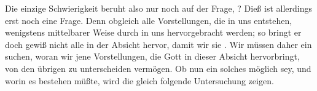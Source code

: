 \begin{aufza}
\item Die einzige Schwierigkeit beruht also nur noch auf der Frage, ? Dieß ist allerdings erst noch eine Frage. Denn obgleich alle Vorstellungen, die in uns entstehen, wenigstens mittelbarer Weise durch  in uns hervorgebracht werden; so bringt er doch gewiß nicht alle in der Absicht hervor, damit wir sie . Wir müssen daher ein  suchen, woran wir jene Vorstellungen, die Gott in dieser Absicht hervorbringt, von den übrigen zu unterscheiden vermögen. Ob nun ein solches möglich sey, und worin es bestehen müßte, wird die gleich folgende Untersuchung zeigen.
\end{aufza}

